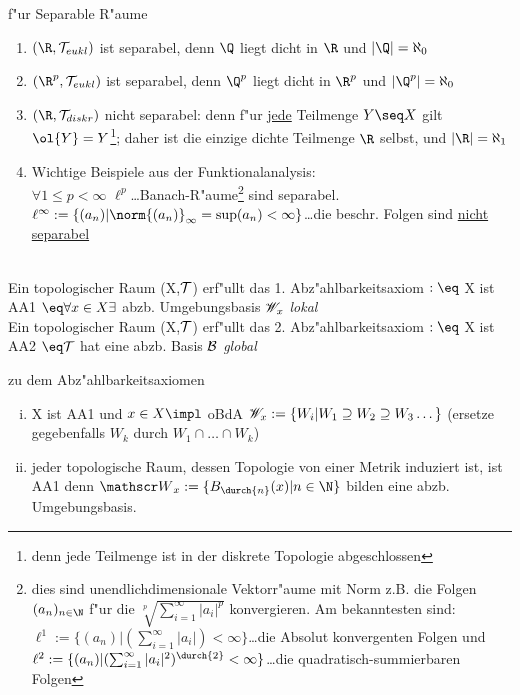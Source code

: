 \begin{beispiel}\label{2.48}{f"ur Separable R"aume}
\begin{enumerate}
\item $(\R ,\T_{eukl})$ ist separabel, denn $\Q$ liegt dicht in $\R$ und $|\Q |=\aleph_0$
\item $(\R^p ,\T_{eukl})$ ist separabel, denn $\Q^p$ liegt dicht in $\R^p$ und $|\Q^p |=\aleph_0$
\item $(\R , \T_{diskr})$ nicht separabel: denn f"ur \ul{jede} Teilmenge $Y\seq X$ gilt $\ol{Y}=Y$\footnote{denn jede Teilmenge ist in der diskrete Topologie abgeschlossen}; daher ist die einzige dichte Teilmenge $\R$ selbst, und $|\R |=\aleph_1$
\item Wichtige Beispiele aus der Funktionalanalysis: \\
$\forall 1\leq p <\infty$ $ \ell^p$\dots {\sc Banach}-R"aume\footnote{dies sind unendlichdimensionale Vektorr"aume mit Norm z.B. die Folgen $(a_n)_{n\in\N}$ f"ur die $\sqrt[p]{\sum_{i=1}^\infty |a_i|^p}$ konvergieren. Am bekanntesten sind:\\ $\ell^1:=\{ (a_n)|(\sum_{i=1}^\infty|a_i|)<\infty\}$\dots die Absolut konvergenten Folgen und\\ $\ell^2:=\{ (a_n)|(\sum_{i=1}^\infty|a_i|^2)^\durch{2}<\infty\}$\dots die quadratisch-summierbaren Folgen} sind separabel.\\
$\ell^\infty:=\{ (a_n)|\norm{(a_n)}_\infty =\sup (a_n)<\infty\}$\dots die beschr. Folgen sind \ul{nicht separabel}
\end{enumerate}
\end{beispiel}

\begin{definition}\label{2.49}\\
Ein topologischer Raum (X,$\mathcal T$) erf"ullt das 1. Abz"ahlbarkeitsaxiom $:\eq$ X ist AA1 $\eq \forall x\in X\exists$ abzb. Umgebungsbasis $\umg{W}{x}\hfill$ {\it lokal}\\
Ein topologischer Raum (X,$\mathcal T$) erf"ullt das 2. Abz"ahlbarkeitsaxiom $:\eq$ X ist AA2 $\eq \T$ hat eine abzb. Basis $\B \hfill $ {\it global}
\end{definition}
\begin{bem}\label{2.50}{zu dem Abz"ahlbarkeitsaxiomen}\\
\begin{enumerate}[(i)]
\item X ist AA1 und $x\in X \impl$ oBdA ${\mathscr W}_{x}:=\{ W_i|W_1\supseteq W_2\supseteq W_3\dots\}$ (ersetze gegebenfalls $W_k$ durch $W_1\cap\dots\cap W_k$)
\item jeder topologische Raum, dessen Topologie von einer Metrik induziert ist, ist AA1 denn $\umg{W}{x}:=\{ B_\durch{n}(x)|n\in\N\}$ bilden eine abzb. Umgebungsbasis.
\end{enumerate}
\end{bem}

